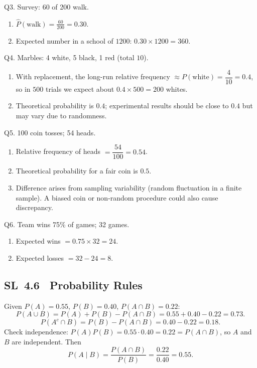 \documentclass[11pt]{article}
\def\textbf#1{#1}%
\newcommand{\tocsubsection}[1]{\subsection{#1}}
\begin{document}
\begin{solution}
\textbf{Q3. Survey: 60 of 200 walk.}
\begin{enumerate}
  \item $\displaystyle \hat P(\text{walk})=\frac{60}{200}=0.30$.
  \item Expected number in a school of $1200$: $0.30\times1200=\boxed{360}$.
\end{enumerate}
\end{solution}

\begin{solution}
\textbf{Q4. Marbles: 4 white, 5 black, 1 red (total $10$).}
\begin{enumerate}
  \item With replacement, the long-run relative frequency $\approx P(\text{white})=\dfrac{4}{10}=0.4$,
        so in $500$ trials we expect about $0.4\times500=\boxed{200}$ whites.
  \item Theoretical probability is $0.4$; experimental results should be close to $0.4$ but may vary due to randomness.
\end{enumerate}
\end{solution}

\begin{solution}
\textbf{Q5. 100 coin tosses; 54 heads.}
\begin{enumerate}
  \item Relative frequency of heads $=\dfrac{54}{100}=0.54$.
  \item Theoretical probability for a fair coin is $0.5$.
  \item Difference arises from sampling variability (random fluctuation in a finite sample). A biased coin or non-random procedure could also cause discrepancy.
\end{enumerate}
\end{solution}

\begin{solution}
\textbf{Q6. Team wins 75\% of games; 32 games.}
\begin{enumerate}
  \item Expected wins $=0.75\times32=\boxed{24}$.
  \item Expected losses $=32-24=\boxed{8}$.
\end{enumerate}
\end{solution}




\tocsubsection{SL 4.6 \; Probability Rules}

\begin{solution}
Given $P(A)=0.55$, $P(B)=0.40$, $P(A\cap B)=0.22$:
\[
P(A\cup B)=P(A)+P(B)-P(A\cap B)=0.55+0.40-0.22=0.73.
\]
\[
P(A^c\cap B)=P(B)-P(A\cap B)=0.40-0.22=0.18.
\]
Check independence: $P(A)P(B)=0.55\cdot0.40=0.22=P(A\cap B)$, so $A$ and $B$ are independent. Then
\[
P(A\mid B)=\frac{P(A\cap B)}{P(B)}=\frac{0.22}{0.40}=0.55.
\]
\end{solution}
\end{document}
